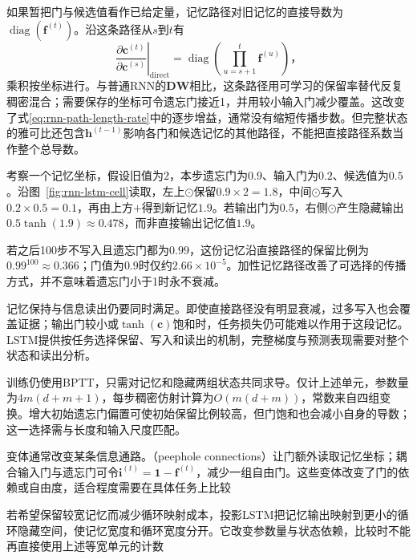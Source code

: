 如果暂把门与候选值看作已给定量，记忆路径对旧记忆的直接导数为$\operatorname{diag}(\bm{f}^{(t)})$。沿这条路径从$s$到$t$有
\begin{equation}
  \left.\frac{\partial\bm c^{(t)}}{\partial\bm c^{(s)}}\right|_{\mathrm{direct}}
    =\operatorname{diag}\!\left(\prod_{u=s+1}^{t}\bm f^{(u)}\right)\text{，}
  \label{eq:rnn-lstm-direct-memory}
\end{equation}
乘积按坐标进行。与普通RNN的$\bm D\bm W$相比，这条路径用可学习的保留率替代反复稠密混合；需要保存的坐标可令遗忘门接近1，并用较小输入门减少覆盖。这改变了式\eqref{eq:rnn-path-length-rate}中的逐步增益，通常没有缩短传播步数。但完整状态的雅可比还包含$\bm h^{(t-1)}$影响各门和候选记忆的其他路径，不能把直接路径系数当作整个总导数。

\begin{example}[门值决定保留和写入]
  \label{ex:rnn-lstm-retention}
  考察一个记忆坐标，假设旧值为$2$，本步遗忘门为$0.9$、输入门为$0.2$、候选值为$0.5$。沿图~\ref{fig:rnn-lstm-cell}读取，左上$\odot$保留$0.9\times2=1.8$，中间$\odot$写入$0.2\times0.5=0.1$，再由上方$+$得到新记忆$1.9$。若输出门为$0.5$，右侧$\odot$产生隐藏输出$0.5\tanh(1.9)\approx0.478$，而非直接输出记忆值$1.9$。

  若之后100步不写入且遗忘门都为$0.99$，这份记忆沿直接路径的保留比例为$0.99^{100}\approx0.366$；门值为$0.9$时仅约$2.66\times10^{-5}$。加性记忆路径改善了可选择的传播方式，并不意味着遗忘门小于1时永不衰减。
\end{example}

记忆保持与信息读出仍要同时满足。即使直接路径没有明显衰减，过多写入也会覆盖证据；输出门较小或$\tanh(\bm c)$饱和时，任务损失仍可能难以作用于这段记忆。LSTM提供按任务选择保留、写入和读出的机制，完整梯度与预测表现需要对整个状态和读出分析。

训练仍使用BPTT，只需对记忆和隐藏两组状态共同求导。仅计上述单元，参数量为$4m(d+m+1)$，每步稠密仿射计算为$O(m(d+m))$，常数来自四组变换。增大初始遗忘门偏置可使初始保留比例较高，但门饱和也会减小自身的导数；这一选择需与长度和输入尺度匹配。

变体通常改变某条信息通路。（peephole connections）让门额外读取记忆坐标；耦合输入门与遗忘门可令$\bm{i}^{(t)}=\bm{1}-\bm{f}^{(t)}$，减少一组自由门。这些变体改变了门的依赖或自由度，适合程度需要在具体任务上比较

若希望保留较宽记忆而减少循环映射成本，投影LSTM把记忆输出映射到更小的循环隐藏空间，使记忆宽度和循环宽度分开。它改变参数量与状态依赖，比较时不能再直接使用上述等宽单元的计数

